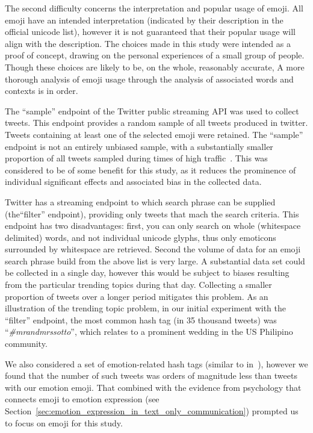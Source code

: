 \documentclass[10pt, a4paper]{article}
\begin{document}
The second difficulty concerns the interpretation and popular usage of emoji. 
All emoji have an intended interpretation (indicated by their description in the official unicode list), however it is not guaranteed that their popular usage will align with the description. 
The choices made in this study were intended as a proof of concept, drawing on the personal experiences of a small group of people. 
Though these choices are likely to be, on the whole, reasonably accurate, 
A more thorough analysis of 
emoji usage through the analysis of associated words and contexts is in order. 

The ``sample'' endpoint of the Twitter public streaming API was used to collect tweets. This endpoint provides a random sample of all tweets produced in twitter.
Tweets containing at least one of the selected emoji were retained. The ``sample'' endpoint is not an entirely unbiased sample, with a substantially smaller proportion of all tweets sampled during times of high traffic~\cite{Morstatter2013Is}. This was considered to be of some benefit for this study, as it reduces the prominence of individual significant effects and associated bias in the collected data.

Twitter has a streaming endpoint to which search phrase can be supplied (the``filter'' endpoint), providing only tweets that mach the search criteria.
This endpoint has two disadvantages: first, you can only search on whole (whitespace delimited) words, and not individual unicode glyphs, thus only emoticons surrounded by whitespace are retrieved. 
Second the volume of data for an emoji search phrase build from the above list is very large. A substantial data set could be collected in a single day, however this would be subject to biases resulting from the particular trending topics during that day. 
Collecting a smaller proportion of tweets over a longer period mitigates this problem.
As an illustration of the trending topic problem, in our initial experiment with the ``filter'' endpoint, the most common hash tag (in 35 thousand tweets) was ``\emph{\#mrandmrssotto}'', which relates to a prominent wedding in the US Philipino community.

We also considered a set of emotion-related hash tags (similar to in~\cite{Mohammad2012Emotional}), however we found that the number of such tweets was orders of magnitude less than tweets with our emotion emoji. That combined with the evidence from psychology that connects emoji to emotion expression (see Section~\ref{sec:emotion_expression_in_text_only_communication}) prompted us to focus on emoji for this study.
\end{document}
